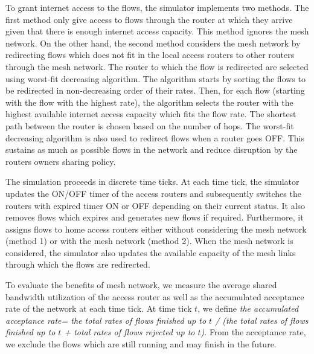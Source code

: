 To grant internet access to the flows, the simulator implements two methods. The first method only give access to flows through the router at which they arrive given that there is enough internet access capacity. This method ignores the mesh network. On the other hand, the second method considers the mesh network by redirecting flows which does not fit in the local access routers to other routers through the mesh network. The router to which the flow is redirected are selected using worst-fit decreasing algorithm. The algorithm starts by sorting the flows to be redirected in non-decreasing order of their rates. Then, for each flow (starting with the flow with the highest rate), the algorithm selects the router with the highest available internet access capacity which fits the flow rate. The shortest path between the router is chosen based on the number of hops. The worst-fit decreasing algorithm is also used to redirect flows when a router goes OFF. This sustains as much as possible flows in the network and reduce disruption by the routers owners sharing policy.

The simulation proceeds in discrete time ticks. At each time tick, the simulator updates the ON/OFF timer of the access routers and subsequently switches the routers with expired timer ON or OFF depending on their current status. It also removes flows which expires and generates new flows if required. Furthermore, it assigns flows to home access routers either without considering the mesh network (method 1) or with the mesh network (method 2). When the mesh network is considered, the simulator also updates the available capacity of the mesh links through which the flows are redirected. 

To evaluate the benefits of mesh network, we measure the average shared bandwidth utilization of the access router as well as the accumulated acceptance rate of the network at each time tick. At time tick $t$, we define \emph{the accumulated acceptance rate= the total rates of flows finished up to $t$ / (the total rates of flows finished up to $t$ + total rates of flows rejected up to $t$)}.
From the acceptance rate, we exclude the flows which are still running and may finish in the future. 

